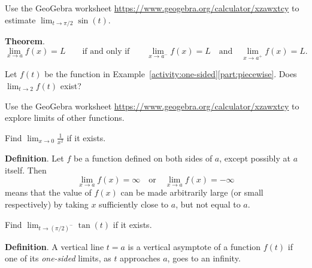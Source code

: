\documentclass[../main.tex]{subfiles}
\begin{document}
\begin{example}
  Use the GeoGebra worksheet \url{https://www.geogebra.org/calculator/xzawxtcy} to estimate \(\lim_{t \to \pi/2} \sin(t)\).
\end{example}

\begin{mdframed}[style=withref]
  \textbf{Theorem}.
  \[
    \lim_{x \to a} f(x) = L \qquad\text{if and only if}\qquad {\lim_{x \to a^{-}} f(x) = L \quad\text{and}\quad \lim_{x \to a^{+}} f(x) = L.}
  \]

\end{mdframed}

\begin{example}
  Let \(f(t)\) be the function in Example~\ref{activity:one-sided}\ref{part:piecewise}. Does \(\lim_{t \to 2} f(t)\) exist?
\end{example}

\begin{example}
  Use the GeoGebra worksheet \url{https://www.geogebra.org/calculator/xzawxtcy} to explore limits of other functions.
\end{example}
\clearpage

\begin{example}
  Find \(\lim_{x \to 0} \frac{1}{x^{2}}\) if it exists.
\end{example}

\begin{mdframed}[style=withref]
  \textbf{Definition}. Let \(f\) be a function defined on both sides of \(a\), except possibly at \(a\) itself. Then
  \[
    \lim_{x \to a} f(x) = \infty
    \quad\text{or}\quad
    \lim_{x \to a} f(x) = -\infty
  \]
  means that the value of \(f(x)\) can be made arbitrarily large (or small respectively) by taking \(x\) sufficiently close to \(a\), but not equal to \(a\).

\end{mdframed}

\begin{example}
  Find \(\lim_{t \to (\pi/2)^{-}} \tan(t)\) if it exists.
\end{example}

\begin{mdframed}[style=withref]
  \textbf{Definition}. A vertical line \(t = a\) is a {vertical asymptote} of a function \(f(t)\) if one of its \emph{one-sided} limits, as \(t\) approaches \(a\), goes to an infinity.

\end{mdframed}
\vfill
\end{document}
